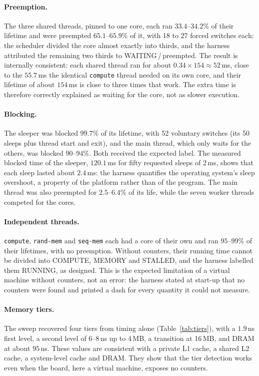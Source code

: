 \documentclass[10pt,a4paper,twocolumn]{article}
\newcommand{\code}[1]{\texttt{\small #1}}
\begin{document}
\paragraph{Preemption.} The three shared threads, pinned to one core, each ran $33.4$--$34.2\%$ of their lifetime and were preempted $65.1$--$65.9\%$ of it, with 18 to 27 forced switches each: the scheduler divided the core almost exactly into thirds, and the harness attributed the remaining two thirds to WAITING\,/\,preempted. The result is internally consistent: each shared thread ran for about $0.34\times154\approx52$\,ms, close to the $55.7$\,ms the identical \code{compute} thread needed on its own core, and their lifetime of about $154$\,ms is close to three times that work. The extra time is therefore correctly explained as waiting for the core, not as slower execution.

\paragraph{Blocking.} The sleeper was blocked $99.7\%$ of its lifetime, with 52 voluntary switches (its 50 sleeps plus thread start and exit), and the main thread, which only waits for the others, was blocked $90$--$94\%$. Both received the expected label. The measured blocked time of the sleeper, $120.1$\,ms for fifty requested sleeps of 2\,ms, shows that each sleep lasted about $2.4$\,ms: the harness quantifies the operating system's sleep overshoot, a property of the platform rather than of the program. The main thread was also preempted for $2.5$--$6.4\%$ of its life, while the seven worker threads competed for the cores.

\paragraph{Independent threads.} \code{compute}, \code{rand-mem} and \code{seq-mem} each had a core of their own and ran $95$--$99\%$ of their lifetimes, with no preemption. Without counters, their running time cannot be divided into COMPUTE, MEMORY and STALLED, and the harness labelled them RUNNING, as designed. This is the expected limitation of a virtual machine without counters, not an error: the harness stated at start-up that no counters were found and printed a dash for every quantity it could not measure.

\paragraph{Memory tiers.} The sweep recovered four tiers from timing alone (Table~\ref{tab:tiers}), with a $1.9$\,ns first level, a second level of $6$--$8$\,ns up to 4\,MB, a transition at 16\,MB, and DRAM at about $95$\,ns. These values are consistent with a private L1 cache, a shared L2 cache, a system-level cache and DRAM. They show that the tier detection works even when the board, here a virtual machine, exposes no counters.
\end{document}
